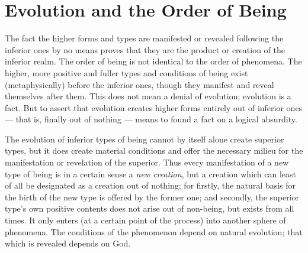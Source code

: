 \section{Evolution and the Order of Being}

\begin{quotationx}
The fact the higher forms and types are manifested or revealed following the inferior ones by no means proves that they are the product or creation of the inferior realm. The order of being is not identical to the order of phenomena. The higher, more positive and fuller types and conditions of being exist (metaphysically) before the inferior ones, though they manifest and reveal themselves after them. This does not mean a denial of evolution; evolution is a fact. But to assert that evolution creates higher forms entirely out of inferior ones --- that is, finally out of nothing --- means to found a fact on a logical absurdity.

The evolution of inferior types of being cannot by itself alone create superior types, but it does create material conditions and offer the necessary milieu for the manifestation or revelation of the superior. Thus every manifestation of a new type of being is in a certain sense a \emph{new creation}, but a creation which can least of all be designated as a creation out of nothing; for firstly, the natural basis for the birth of the new type is offered by the former one; and secondly, the superior type's own positive contents does not arise out of non-being, but exists from all times. It only enters (at a certain point of the process) into another sphere of phenomena. The conditions of the phenomenon depend on natural evolution; that which is revealed depends on God.
\end{quotationx}




